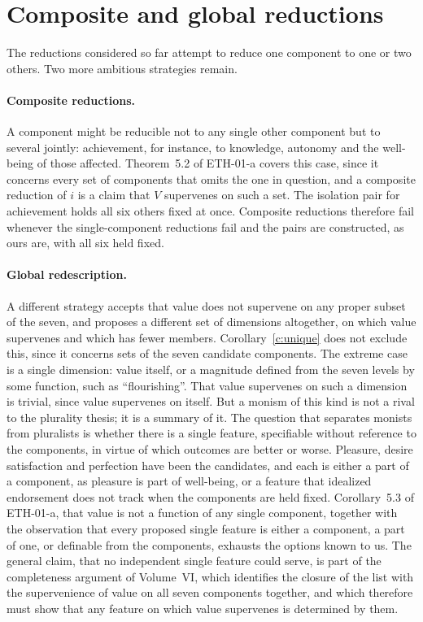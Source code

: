 \documentclass{situationist-preprint}
\begin{document}
\section{Composite and global reductions}\label{s:composite}

The reductions considered so far attempt to reduce one component to one or two others. Two more ambitious strategies remain.

\paragraph{Composite reductions.} A component might be reducible not to any single other component but to several jointly: achievement, for instance, to knowledge, autonomy and the well-being of those affected. Theorem~5.2 of ETH-01-a covers this case, since it concerns every set of components that omits the one in question, and a composite reduction of $i$ is a claim that $V$ supervenes on such a set. The isolation pair for achievement holds all six others fixed at once. Composite reductions therefore fail whenever the single-component reductions fail and the pairs are constructed, as ours are, with all six held fixed.

\paragraph{Global redescription.} A different strategy accepts that value does not supervene on any proper subset of the seven, and proposes a different set of dimensions altogether, on which value supervenes and which has fewer members. Corollary~\ref{c:unique} does not exclude this, since it concerns sets of the seven candidate components. The extreme case is a single dimension: value itself, or a magnitude defined from the seven levels by some function, such as \enquote{flourishing}. That value supervenes on such a dimension is trivial, since value supervenes on itself. But a monism of this kind is not a rival to the plurality thesis; it is a summary of it. The question that separates monists from pluralists is whether there is a single feature, specifiable without reference to the components, in virtue of which outcomes are better or worse. Pleasure, desire satisfaction and perfection have been the candidates, and each is either a part of a component, as pleasure is part of well-being, or a feature that idealized endorsement does not track when the components are held fixed. Corollary~5.3 of ETH-01-a, that value is not a function of any single component, together with the observation that every proposed single feature is either a component, a part of one, or definable from the components, exhausts the options known to us. The general claim, that no independent single feature could serve, is part of the completeness argument of Volume~VI, which identifies the closure of the list with the supervenience of value on all seven components together, and which therefore must show that any feature on which value supervenes is determined by them.
\end{document}
